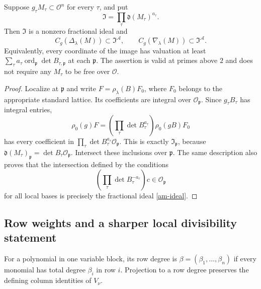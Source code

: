 \begin{theorem}\label{am-integral}
Suppose $g_\tau M_\tau\subset\mathcal O^n$ for every $\tau$, and put
\begin{equation}\label{am-ideal}
                  \mathfrak I=\prod_\tau\mathfrak d(M_\tau)^{a_\tau}.
\end{equation}
Then $\mathfrak I$ is a nonzero fractional ideal and
\[
 C_g(\Delta_\lambda(M))\subset\mathfrak I^{\mathcal A},
 \qquad
 C_g(\nabla_\lambda(M))\subset\mathfrak I^{\mathcal A}.
 \tag{AM2}\label{am-image}
\]
Equivalently, every coordinate of the image has valuation at least
$\sum_\tau a_\tau\operatorname{ord}_{\mathfrak p}\det B_{\tau,\mathfrak p}$
at each $\mathfrak p$. The assertion is valid at primes above $2$ and
does not require any $M_\tau$ to be free over $\mathcal O$.
\end{theorem}
\begin{proof}
Localize at $\mathfrak p$ and write
$F=\rho_\lambda(B)F_0$, where $F_0$ belongs to the appropriate standard
lattice. Its coefficients are integral over $\mathcal O_{\mathfrak p}$.
Since $g_\tau B_\tau$ has integral entries,
\[
 \rho_0(g)F
   =\left(\prod_\tau\det B_\tau^{a_\tau}\right)\rho_0(gB)F_0
\]
has every coefficient in
$\prod_\tau\det B_\tau^{a_\tau}\mathcal O_{\mathfrak p}$.
This is exactly $\mathfrak I_{\mathfrak p}$, because
$\mathfrak d(M_\tau)_{\mathfrak p}=\det B_\tau\mathcal O_{\mathfrak p}$.
Intersect these inclusions over $\mathfrak p$. The same description also
proves that the intersection defined by the conditions
\[
 \left(\prod_\tau\det B_\tau^{-a_\tau}\right)c
                              \in\mathcal O_{\mathfrak p}
\]
for all local bases is precisely the fractional ideal \eqref{am-ideal}.
\end{proof}

\subsection{Row weights and a sharper local divisibility statement}

For a polynomial in one variable block, its row degree is
$\beta=(\beta_1,\ldots,\beta_n)$ if every monomial has total degree
$\beta_i$ in row $i$. Projection to a row degree preserves the defining
column identities of $V_\nu$.

